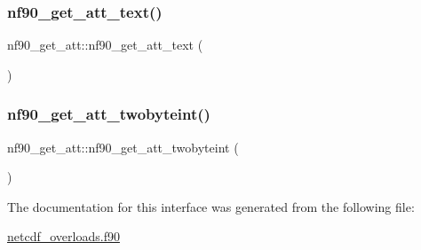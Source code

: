 \subsubsection{\texorpdfstring{nf90\+\_\+get\+\_\+att\+\_\+text()}{nf90\_get\_att\_text()}}
{\footnotesize\ttfamily nf90\+\_\+get\+\_\+att\+::nf90\+\_\+get\+\_\+att\+\_\+text (\begin{DoxyParamCaption}{ }\end{DoxyParamCaption})}

\mbox{\label{interfacenf90__get__att_a3b05ff02705737bb0a8b9a2c57c2faae}} 
\subsubsection{\texorpdfstring{nf90\+\_\+get\+\_\+att\+\_\+twobyteint()}{nf90\_get\_att\_twobyteint()}}
{\footnotesize\ttfamily nf90\+\_\+get\+\_\+att\+::nf90\+\_\+get\+\_\+att\+\_\+twobyteint (\begin{DoxyParamCaption}{ }\end{DoxyParamCaption})}



The documentation for this interface was generated from the following file\+:\begin{DoxyCompactItemize}
\item 
\hyperlink{netcdf__overloads_8f90}{netcdf\+\_\+overloads.\+f90}\end{DoxyCompactItemize}
